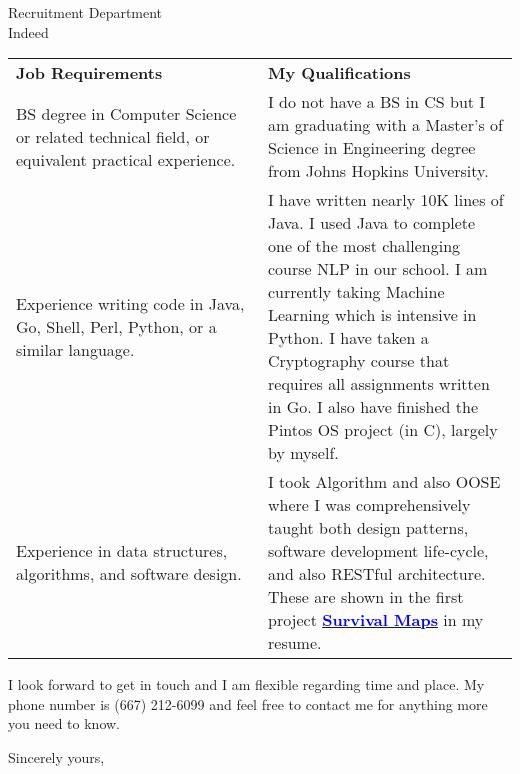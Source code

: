 \documentclass[11pt]{letter} %
\begin{document}
\begin{letter}{Recruitment Department \\
Indeed}
\begin{tabular}{p{0.5\linewidth} p{0.5\linewidth}}
\textbf{Job Requirements} & \textbf{My Qualifications} \\
BS degree in Computer Science or related technical field, or equivalent practical experience. & I do not have a BS in CS but I am graduating with a Master's of Science in Engineering degree from Johns Hopkins University. \\
Experience writing code in Java, Go, Shell, Perl, Python, or a similar language. & I have written nearly 10K lines of Java. I used Java to complete one of the most challenging course NLP in our school. I am currently taking Machine Learning which is intensive in Python. I have taken a Cryptography course that requires all assignments written in Go. I also have finished the Pintos OS project (in C), largely by myself. \\
Experience in data structures, algorithms, and software design. & I took Algorithm and also OOSE where I was comprehensively taught both design patterns, software development life-cycle, and also RESTful architecture. These are shown in the first project \href{https://github.com/cc941201/SurvivalMaps}{\textcolor{blue}{\textbf{Survival Maps}}} in my resume.
\end{tabular}

I look forward to get in touch and I am flexible regarding time and place. My phone number is (667) 212-6099 and feel free to contact me for anything more you need to know.

\closing{Sincerely yours,}




\end{letter}
\end{document}
